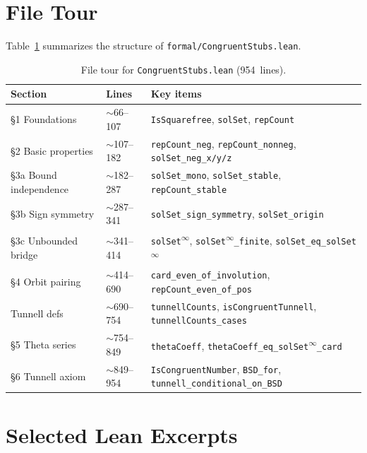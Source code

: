 \documentclass[11pt,a4paper]{article}
\theoremstyle{definition}
\newcommand{\lean}[1]{\texttt{#1}}
\begin{document}
\appendix
\section{File Tour}\label{app:tour}

Table~\ref{tab:tour} summarizes the structure of
\texttt{formal/CongruentStubs.lean}.

\begin{table}[ht]
\centering
\small
\begin{tabular}{@{}llp{6cm}@{}}
\toprule
\textbf{Section} & \textbf{Lines} & \textbf{Key items} \\
\midrule
\S1 Foundations
  & $\sim$66--107
  & \lean{IsSquarefree}, \lean{solSet}, \lean{repCount} \\
\S2 Basic properties
  & $\sim$107--182
  & \lean{repCount\_neg}, \lean{repCount\_nonneg},
    \lean{solSet\_neg\_x/y/z} \\
\S3a Bound independence
  & $\sim$182--287
  & \lean{solSet\_mono}, \lean{solSet\_stable},
    \lean{repCount\_stable} \\
\S3b Sign symmetry
  & $\sim$287--341
  & \lean{solSet\_sign\_symmetry}, \lean{solSet\_origin} \\
\S3c Unbounded bridge
  & $\sim$341--414
  & \lean{solSet\textsuperscript{$\infty$}},
    \lean{solSet\textsuperscript{$\infty$}\_finite},
    \lean{solSet\_eq\_solSet\textsuperscript{$\infty$}} \\
\S4 Orbit pairing
  & $\sim$414--690
  & \lean{card\_even\_of\_involution},
    \lean{repCount\_even\_of\_pos} \\
Tunnell defs
  & $\sim$690--754
  & \lean{tunnellCounts}, \lean{isCongruentTunnell},
    \lean{tunnellCounts\_cases} \\
\S5 Theta series
  & $\sim$754--849
  & \lean{thetaCoeff},
    \lean{thetaCoeff\_eq\_solSet\textsuperscript{$\infty$}\_card} \\
\S6 Tunnell axiom
  & $\sim$849--954
  & \lean{IsCongruentNumber}, \lean{BSD\_for},
    \lean{tunnell\_conditional\_on\_BSD} \\
\bottomrule
\end{tabular}
\caption{File tour for \texttt{CongruentStubs.lean} (954~lines).}
\label{tab:tour}
\end{table}

\section{Selected Lean Excerpts}\label{app:code}
\end{document}
